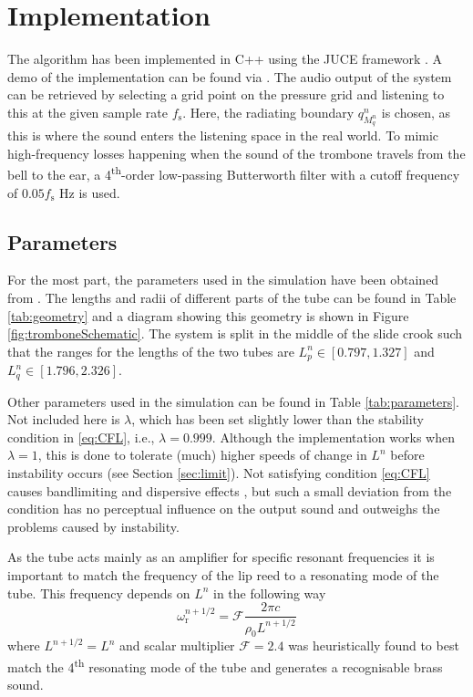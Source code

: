 \section{Implementation}\label{sec:implementation}
The algorithm has been implemented in C++ using the JUCE framework \cite{JUCE}. A demo of the implementation can be found via \cite{DEMO}. The audio output of the system can be retrieved by selecting a grid point on the pressure grid and listening to this at the given sample rate $f_\text{s}$. Here, the radiating boundary $q_{M_q^n}^n$ is chosen, as this is where the sound enters the listening space in the real world. To mimic high-frequency losses happening when the sound of the trombone travels from the bell to the ear, a 4\textsuperscript{th}-order low-passing Butterworth filter with a cutoff frequency of $0.05 f_\text{s}$ Hz is used.  

\subsection{Parameters}
For the most part, the parameters used in the simulation have been obtained from \cite{Harrison2018, Smyth2011, Benade1968}. The lengths and radii of different parts of the tube can be found in Table \ref{tab:geometry} and a diagram showing this geometry is shown in Figure \ref{fig:tromboneSchematic}.
The system is split in the middle of the slide crook such that the ranges for the lengths of the two tubes are $L_p^n \in[0.797, 1.327]$ and $L_q^n \in [1.796, 2.326]$.

Other parameters used in the simulation can be found in Table \ref{tab:parameters}. Not included here is $\lambda$, which has been set slightly lower than the stability condition in \eqref{eq:CFL}, i.e., $\lambda = 0.999$. Although the implementation works when $\lambda = 1$, this is done to tolerate (much) higher speeds of change in $L^n$ before instability occurs (see Section \ref{sec:limit}). Not satisfying condition \eqref{eq:CFL} causes bandlimiting and dispersive effects \cite{bilbao2009}, but such a small deviation from the condition has no perceptual influence on the output sound and outweighs the problems caused by instability.

As the tube acts mainly as an amplifier for specific resonant frequencies it is important to match the frequency of the lip reed to a resonating mode of the tube. This frequency depends on $L^n$ in the following way
\begin{equation}\label{eq:lipReedCalc}
    \omega_\text{r}^{n+1/2} = \mathcal{F}\frac{2\pi c}{\rho_0 L^{n+1/2}}
\end{equation}
where $L^{n+1/2} = L^n$ and scalar multiplier $\mathcal{F} = 2.4$ was heuristically found to best match the 4\textsuperscript{th} resonating mode of the tube and generates a recognisable brass sound.

